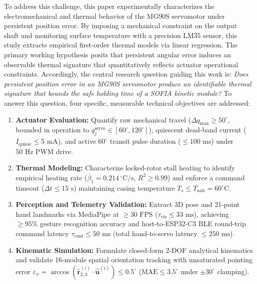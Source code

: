 \documentclass[lettersize,journal]{IEEEtran}
\begin{document}
	To address this challenge, this paper experimentally characterizes the electromechanical and thermal behavior of the MG90S servomotor under persistent position error. By imposing a mechanical constraint on the output shaft and monitoring surface temperature with a precision LM35 sensor, this study extracts empirical first-order thermal models via linear regression. The primary working hypothesis posits that persistent angular error induces an observable thermal signature that quantitatively reflects actuator operational constraints. Accordingly, the central research question guiding this work is: \textit{Does persistent position error in an MG90S servomotor produce an identifiable thermal signature that bounds the safe holding time of a SOFIA kinetic module?} To answer this question, four specific, measurable technical objectives are addressed:
	\begin{enumerate}
		\setlength{\itemsep}{0pt}
		\setlength{\parskip}{0pt}
		\setlength{\parsep}{0pt}
		\item {}\textbf{Actuator Evaluation:} Quantify raw mechanical travel ($\Delta q_{\max} \ge 50^\circ$, bounded in operation to $q_j^{\text{servo}} \in [60^\circ, 120^\circ]$), quiescent dead-band current ($I_{\text{quiesc}} \le 5\text{ mA}$), and active $60^\circ$ transit pulse duration ($\le 100\text{ ms}$) under $50\text{ Hz}$ PWM drive.
		\item {}\textbf{Thermal Modeling:} Characterize locked-rotor stall heating to identify empirical heating rate ($\bar{\beta}_1 = 0.214\,^\circ\text{C/s}$, $R^2 \ge 0.99$) and enforce a command timeout ($\Delta t \le 15\text{ s}$) maintaining casing temperature $T_s \le T_{\text{safe}} = 60^\circ\text{C}$.
		\item {}\textbf{Perception and Telemetry Validation:} Extract 3D pose and 21-point hand landmarks via MediaPipe at $\ge 30\text{ FPS}$ ($\tau_{\text{vis}} \le 33\text{ ms}$), achieving $\ge 95\%$ gesture recognition accuracy and host-to-ESP32-C3 BLE round-trip command latency $\tau_{\text{cmd}} \le 50\text{ ms}$ (total hand-to-servo latency $\le 250\text{ ms}$).
		\item {}\textbf{Kinematic Simulation:} Formulate closed-form 2-DOF analytical kinematics and validate 16-module spatial orientation tracking with unsaturated pointing error $\varepsilon_\psi = \arccos(\hat{\mathbf{r}}_{2,3}^{(i)} \cdot \hat{\mathbf{u}}^{(i)}) \le 0.5^\circ$ ($\text{MAE} \le 3.5^\circ$ under $\pm 30^\circ$ clamping).
	\end{enumerate}
\end{document}
